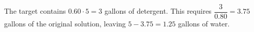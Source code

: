 The target contains $0.60\cdot5=3$ gallons of detergent. This requires $\dfrac{3}{0.80}=3.75$ gallons of the original solution, leaving $5-3.75=\boxed{1.25}$ gallons of water.
